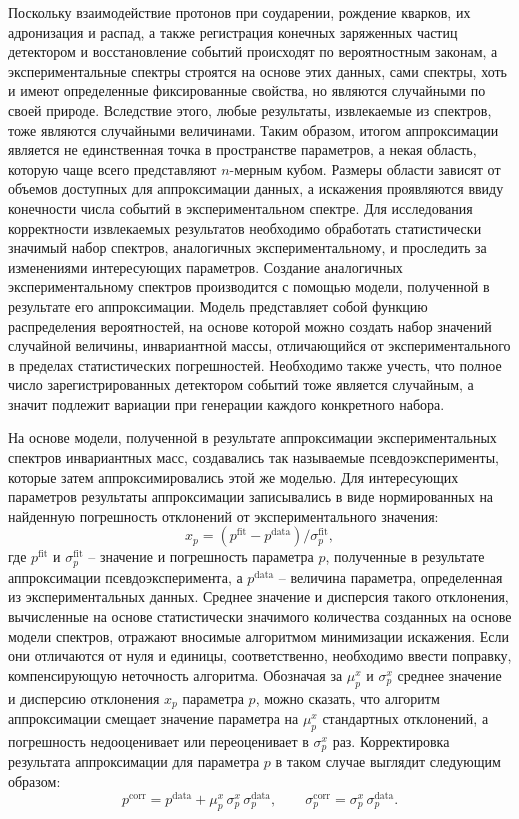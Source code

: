 Поскольку взаимодействие протонов при соударении, рождение кварков, их 
адронизация и распад, а также регистрация конечных заряженных частиц 
детектором и восстановление событий происходят по вероятностным законам, 
а экспериментальные спектры строятся на основе этих данных, сами 
спектры, хоть и имеют определенные фиксированные свойства, но являются 
случайными по своей природе. Вследствие этого, любые результаты, 
извлекаемые из спектров, тоже являются случайными величинами. Таким 
образом, итогом аппроксимации является не единственная точка 
в пространстве параметров, а некая область, которую чаще всего 
представляют $n$\nobreakdash-мерным кубом. Размеры области зависят от 
объемов доступных для аппроксимации данных, а искажения проявляются 
ввиду конечности числа событий в экспериментальном спектре.
%
Для исследования корректности извлекаемых результатов необходимо 
обработать статистически значимый набор спектров, аналогичных 
экспериментальному, и проследить за изменениями интересующих параметров. 
Создание аналогичных экспериментальному спектров производится с помощью 
модели, полученной в результате его аппроксимации. Модель представляет 
собой функцию распределения вероятностей, на основе которой можно 
создать набор значений случайной величины, инвариантной массы, 
отличающийся от экспериментального в пределах статистических 
погрешностей. Необходимо также учесть, что полное число 
зарегистрированных детектором событий тоже является случайным, а значит 
подлежит вариации при генерации каждого конкретного набора.

На основе модели, полученной в результате аппроксимации 
экспериментальных спектров инвариантных масс, создавались так называемые 
псевдоэксперименты, которые затем аппроксимировались этой же моделью. 
Для интересующих параметров результаты аппроксимации записывались в виде 
нормированных на найденную погрешность отклонений от экспериментального 
значения:
\[ x_p = (p^\text{fit} - p^\text{data}) / \sigma_p^\text{fit}, \]
где $p^\text{fit}$ и $\sigma_p^\text{fit}$ -- значение и погрешность 
параметра $p$, полученные в результате аппроксимации псевдоэксперимента, 
а $p^\text{data}$ -- величина параметра, определенная из 
экспериментальных данных. Среднее значение и дисперсия такого 
отклонения, вычисленные на основе статистически значимого количества 
созданных на основе модели спектров, отражают вносимые алгоритмом 
минимизации искажения. Если они отличаются от нуля и единицы, 
соответственно, необходимо ввести поправку, компенсирующую неточность 
алгоритма. Обозначая за $\mu_p^x$ и $\sigma_p^x$ среднее значение 
и дисперсию отклонения $x_p$ параметра $p$, можно сказать, что алгоритм 
аппроксимации смещает значение параметра на $\mu_p^x$ стандартных 
отклонений, а погрешность недооценивает или переоценивает в $\sigma_p^x$ 
раз. Корректировка результата аппроксимации для параметра $p$ в таком 
случае выглядит следующим образом:
\[ p^\text{corr} = p^\text{data} + \mu_p^x\,\sigma_p^x\,\sigma_p^\text{data},
\qquad \sigma_p^\text{corr} = \sigma_p^x\,\sigma_p^\text{data}. \]


